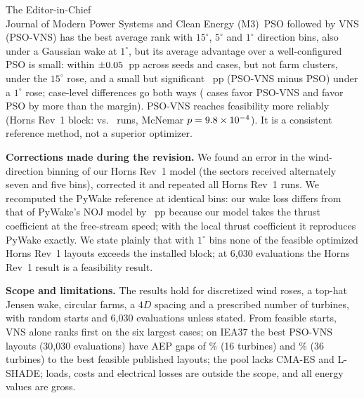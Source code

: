 \documentclass[11pt]{letter}
\newcommand{\Journal}{Journal of Modern Power Systems and Clean Energy}
\newcommand{\JournalEditor}{The Editor-in-Chief}
\begin{document}
\begin{letter}{\JournalEditor\\\Journal}
(M3)~PSO followed by VNS (PSO-VNS) has the best average rank with $15^\circ$, $5^\circ$ and $1^\circ$ direction bins, also under a Gaussian wake at $1^\circ$, but its average advantage over a well-configured PSO is small: within $\pm0.05$~pp across seeds and cases, but not farm clusters, under the $15^\circ$ rose, and a small but significant \NFPairMeanOne~pp (PSO-VNS minus PSO) under a $1^\circ$ rose; case-level differences go both ways (\NXHetBeyondPSOVNS{} cases favor PSO-VNS and \NXHetBeyondPSO{} favor PSO by more than the margin). PSO-VNS reaches feasibility more reliably (Horns Rev~1 block: \NHRFeasPSOVNS{} vs.\ \NHRFeasPSO{} runs, McNemar $p=9.8\times10^{-4}$). It is a consistent reference method, not a superior optimizer.

\textbf{Corrections made during the revision.} We found an error in the wind-direction binning of our Horns Rev~1 model (the sectors received alternately seven and five bins), corrected it and repeated all Horns Rev~1 runs. We recomputed the PyWake reference at identical bins: our wake loss differs from that of PyWake's NOJ model by \NFPyWakeLossDiffPP~pp because our model takes the thrust coefficient at the free-stream speed; with the local thrust coefficient it reproduces PyWake exactly. We state plainly that with $1^\circ$ bins none of the \NFHRNFeas{} feasible optimized Horns Rev~1 layouts exceeds the installed block; at 6,030 evaluations the Horns Rev~1 result is a feasibility result.

\textbf{Scope and limitations.} The results hold for discretized wind roses, a top-hat Jensen wake, circular farms, a $4D$ spacing and a prescribed number of turbines, with random starts and 6,030 evaluations unless stated. From feasible starts, VNS alone ranks first on the six largest cases; on IEA37 the best PSO-VNS layouts (30,030 evaluations) have AEP gaps of \NFIEAGapSixteenThirtyKProj\% (16 turbines) and \NFIEAGapThirtySixThirtyKProj\% (36 turbines) to the best feasible published layouts; the pool lacks CMA-ES and L-SHADE; loads, costs and electrical losses are outside the scope, and all energy values are gross.


\end{letter}
\end{document}
